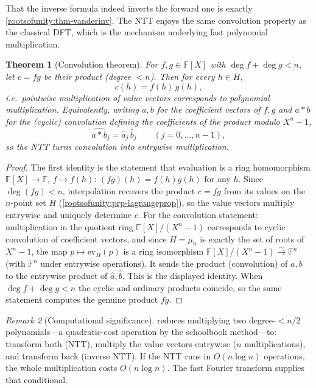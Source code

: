 \documentclass[11pt,a4paper]{article}
\newtheorem{theorem}{Theorem}[section]
\theoremstyle{definition}
\theoremstyle{remark}
\newtheorem{remark}[theorem]{Remark}
\newcommand{\F}{\ensuremath{\mathbb{F}}}
\begin{document}
That the inverse formula indeed inverts the forward one is exactly \cref{rootsofunity:thm-vanderinv}. The NTT enjoys the same convolution property as the classical DFT, which is the mechanism underlying fast polynomial multiplication.

\begin{theorem}[Convolution theorem]\label{rootsofunity:thm-convolution}
For \(f, g \in \F[X]\) with \(\deg f + \deg g < n\), let \(c = f g\) be their product (degree \(< n\)). Then for every \(h \in H\),
\[
  c(h) = f(h)\,g(h),
\]
i.e.\ pointwise multiplication of value vectors corresponds to polynomial multiplication. Equivalently, writing \(a, b\) for the coefficient vectors of \(f,g\) and \(a * b\) for the (cyclic) convolution defining the coefficients of the product modulo \(X^n-1\),
\[
  \widehat{a * b}_j = \hat a_j\,\hat b_j \qquad (j = 0,\dots,n-1),
\]
so the NTT turns convolution into entrywise multiplication.
\end{theorem}

\begin{proof}
The first identity is the statement that evaluation is a ring homomorphism \(\F[X] \to \F\), \(f \mapsto f(h)\): \((fg)(h) = f(h)g(h)\) for any \(h\). Since \(\deg(fg) < n\), interpolation recovers the product \(c = fg\) from its values on the \(n\)-point set \(H\) (\cref{rootsofunity:prp-lagrangeprop}), so the value vectors multiply entrywise and uniquely determine \(c\). For the convolution statement: multiplication in the quotient ring \(\F[X]/(X^n-1)\) corresponds to cyclic convolution of coefficient vectors, and since \(H = \mu_n\) is exactly the set of roots of \(X^n-1\), the map \(p \mapsto \mathrm{ev}_H(p)\) is a ring isomorphism \(\F[X]/(X^n-1) \xrightarrow{\sim} \F^n\) (with \(\F^n\) under entrywise operations). It sends the product (convolution) of \(a, b\) to the entrywise product of \(\hat a, \hat b\). This is the displayed identity. When \(\deg f + \deg g < n\) the cyclic and ordinary products coincide, so the same statement computes the genuine product \(fg\).
\end{proof}

\begin{remark}[Computational significance]\label{rootsofunity:rem-whyntt}
 reduces multiplying two degree-\(<n/2\) polynomials---a quadratic-cost operation by the schoolbook method---to: transform both ($\mathrm{NTT}$), multiply the value vectors entrywise ($n$ multiplications), and transform back (inverse $\mathrm{NTT}$). If the NTT runs in \(O(n\log n)\) operations, the whole multiplication costs \(O(n\log n)\). The fast Fourier transform supplies that conditional.
\end{remark}
\end{document}
